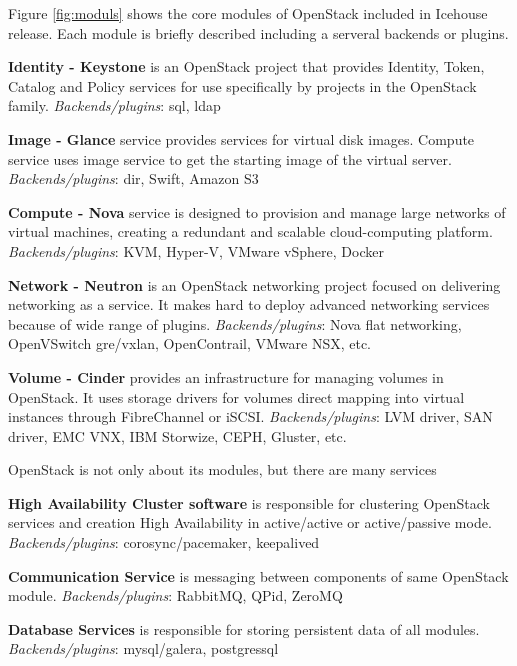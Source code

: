 Figure \ref{fig:moduls} shows the core modules of OpenStack included in Icehouse release. Each module is briefly described including a serveral backends or plugins.





\textbf{Identity - Keystone} is an OpenStack project that provides Identity, Token, Catalog and Policy services for use specifically by projects in the OpenStack family. 
\textit{Backends/plugins}: sql, ldap

\textbf{Image - Glance} service provides services for virtual disk images. Compute service uses image service to get the starting image of the virtual server.
\textit{Backends/plugins}: dir, Swift, Amazon S3

\textbf{Compute - Nova} service is designed to provision and manage large networks of virtual machines, creating a redundant and scalable cloud-computing platform. 
\textit{Backends/plugins}: KVM, Hyper-V, VMware vSphere, Docker

\textbf{Network - Neutron} is an OpenStack networking project focused on delivering networking as a service. It makes hard to deploy advanced networking services because of wide range of plugins.
\textit{Backends/plugins}: Nova flat networking, OpenVSwitch gre/vxlan, OpenContrail, VMware NSX, etc.

\textbf{Volume - Cinder} provides an infrastructure for managing volumes in OpenStack. It uses storage drivers for volumes direct mapping into virtual instances through FibreChannel or iSCSI. 
\textit{Backends/plugins}: LVM driver, SAN driver, EMC VNX, IBM Storwize, CEPH, Gluster, etc.


OpenStack is not only about its modules, but there are many services

\textbf{High Availability Cluster software} is responsible for clustering OpenStack services and creation High Availability in active/active or active/passive mode.
\textit{Backends/plugins}: corosync/pacemaker, keepalived

\textbf{Communication Service} is messaging between components of same OpenStack module.
\textit{Backends/plugins}: RabbitMQ, QPid, ZeroMQ

\textbf{Database Services} is responsible for storing persistent data of all modules.
\textit{Backends/plugins}: mysql/galera, postgressql

